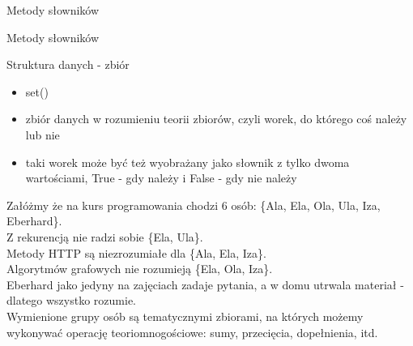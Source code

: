 \begin{frame}{Metody słowników}
\end{frame}

\begin{frame}{Metody słowników}
    
\end{frame}

\begin{frame}{Struktura danych - zbiór}
    \begin{itemize}
        \item set() \\
        \item zbiór danych w rozumieniu teorii zbiorów, czyli worek, do którego coś należy lub nie \\
        \item taki worek może być też wyobrażany jako słownik z tylko dwoma wartościami, True - gdy należy
        i False - gdy nie należy
    \end{itemize}
    Załóżmy że na kurs programowania chodzi 6 osób: \{Ala, Ela, Ola, Ula, Iza, Eberhard\}. \\
    Z rekurencją nie radzi sobie \{Ela, Ula\}. \\
    Metody HTTP są niezrozumiałe dla \{Ala, Ela, Iza\}. \\
    Algorytmów grafowych nie rozumieją \{Ela, Ola, Iza\}. \\
    Eberhard jako jedyny na zajęciach zadaje pytania, a w domu utrwala materiał - dlatego wszystko rozumie. \\
    Wymienione grupy osób są tematycznymi zbiorami, na których możemy wykonywać operację teoriomnogościowe:
    sumy, przecięcia, dopełnienia, itd.
\end{frame}

